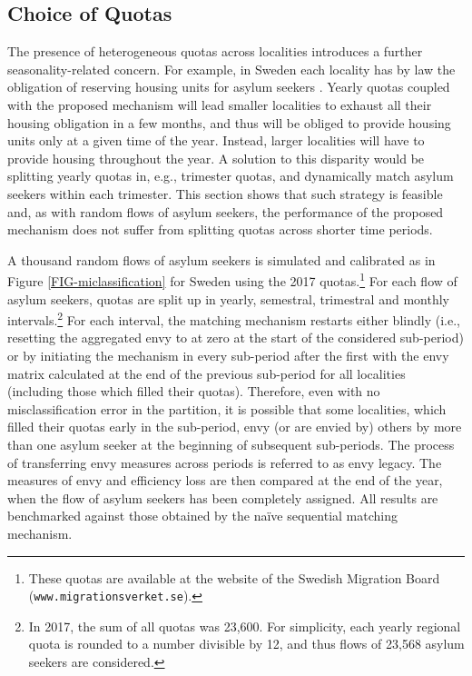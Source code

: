 \documentclass[12pt,fleqn]{article}
\begin{document}
\subsection{Choice of Quotas}\label{SEC:quotas}
The presence of heterogeneous quotas across localities introduces a further seasonality-related concern. For example, in Sweden each locality has by law the obligation of reserving housing units for asylum seekers \citep[Swedish Law,][]{SFS2016}. Yearly quotas coupled with the proposed mechanism will lead smaller localities to exhaust all their housing obligation in a few months, and thus will be obliged to provide housing units only at a given time of the year. Instead, larger localities will have to provide housing throughout the year. A solution to this disparity would be splitting yearly quotas in, e.g., trimester quotas, and dynamically match asylum seekers within each trimester. This section shows that such strategy is feasible and, as with random flows of asylum seekers, the performance of the proposed mechanism does not suffer from splitting quotas across shorter time periods.

A thousand random flows of asylum seekers is simulated and calibrated as in Figure \ref{FIG-miclassification} for Sweden using the 2017 quotas.\footnote{These quotas are available at the website of the Swedish Migration Board (\texttt{www.migrationsverket.se}).} For each flow of asylum seekers, quotas are split up in yearly, semestral, trimestral and monthly intervals.\footnote{In 2017, the sum of all quotas was 23,600. For simplicity, each yearly regional quota is rounded to a number divisible by 12, and thus flows of 23,568 asylum seekers are considered.} For each interval, the matching mechanism restarts either blindly (i.e., resetting the aggregated envy to at zero at the start of the considered sub-period) or by initiating the mechanism in every sub-period after the first with the envy matrix calculated at the end of the previous sub-period for all localities (including those which filled their quotas). Therefore, even with no misclassification error in the partition, it is possible that some localities, which filled their quotas early in the sub-period, envy (or are envied by) others by more than one asylum seeker at the beginning of subsequent sub-periods. The process of transferring envy measures across periods is referred to as envy legacy. The measures of envy and efficiency loss are then compared at the end of the year, when the flow of asylum seekers has been completely assigned. All results are benchmarked against those obtained by the na\"{i}ve sequential matching mechanism.
\end{document}
